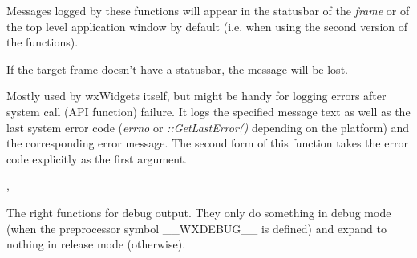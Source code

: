 
Messages logged by these functions will appear in the statusbar of the {\it
frame} or of the top level application window by default (i.e. when using
the second version of the functions).

If the target frame doesn't have a statusbar, the message will be lost.


\label{wxlogsyserror}



Mostly used by wxWidgets itself, but might be handy for logging errors after
system call (API function) failure. It logs the specified message text as well
as the last system error code ({\it errno} or {\it ::GetLastError()} depending
on the platform) and the corresponding error message. The second form
of this function takes the error code explicitly as the first argument.


,


\label{wxlogdebug}



The right functions for debug output. They only do something in debug
mode (when the preprocessor symbol \_\_WXDEBUG\_\_ is defined) and expand to
nothing in release mode (otherwise).


\label{wxlogtrace}





